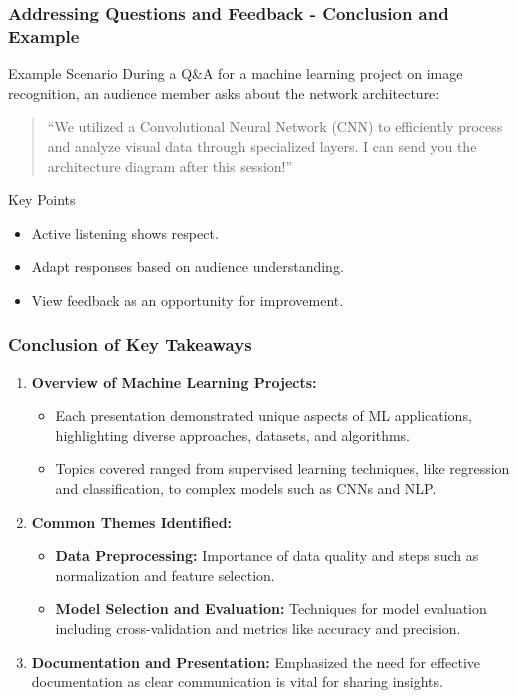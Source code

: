 \documentclass[aspectratio=169]{beamer}
\begin{document}
\begin{frame}[fragile]
    \frametitle{Addressing Questions and Feedback - Conclusion and Example}
    \begin{block}{Example Scenario}
        During a Q&A for a machine learning project on image recognition, an audience member asks about the network architecture:
        \begin{quote}
            “We utilized a Convolutional Neural Network (CNN) to efficiently process and analyze visual data through specialized layers. I can send you the architecture diagram after this session!”
        \end{quote}
    \end{block}
    
    \begin{block}{Key Points}
        \begin{itemize}
            \item Active listening shows respect.
            \item Adapt responses based on audience understanding.
            \item View feedback as an opportunity for improvement.
        \end{itemize}
    \end{block}
\end{frame}

\begin{frame}[fragile]
  \frametitle{Conclusion of Key Takeaways}

  \begin{enumerate}
    \item \textbf{Overview of Machine Learning Projects:}
    \begin{itemize}
      \item Each presentation demonstrated unique aspects of ML applications, highlighting diverse approaches, datasets, and algorithms.
      \item Topics covered ranged from supervised learning techniques, like regression and classification, to complex models such as CNNs and NLP.
    \end{itemize}
  
    \item \textbf{Common Themes Identified:}
    \begin{itemize}
      \item \textbf{Data Preprocessing:} Importance of data quality and steps such as normalization and feature selection.
      \item \textbf{Model Selection and Evaluation:} Techniques for model evaluation including cross-validation and metrics like accuracy and precision.
    \end{itemize}
  
    \item \textbf{Documentation and Presentation:} Emphasized the need for effective documentation as clear communication is vital for sharing insights.
  \end{enumerate}
\end{frame}
\end{document}
